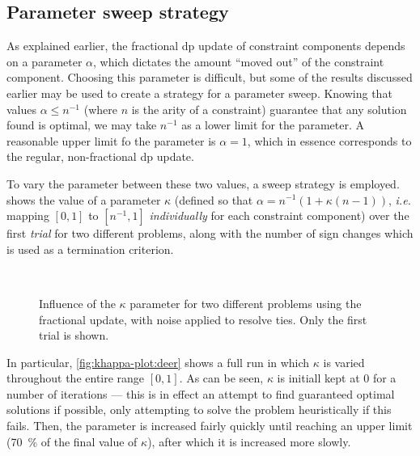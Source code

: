 \subsection{Parameter sweep strategy}
As explained earlier, the fractional \gls{dp} update of constraint components depends on a parameter \(\alpha\), which dictates the amount \enquote{moved out} of the constraint component.
Choosing this parameter is difficult, but some of the results discussed earlier may be used to create a strategy for a parameter sweep.
Knowing that values \(\alpha\leq n^{-1}\) (where \(n\) is the arity of a constraint) guarantee that any solution found is optimal, we may take \(n^{-1}\) as a lower limit for the parameter.
A reasonable upper limit fo the parameter is \(\alpha=1\), which in essence corresponds to the regular, non-fractional \gls{dp} update.

To vary the parameter between these two values, a sweep strategy is employed.
 shows the value of a parameter \(\kappa\) (defined so that \(\alpha = n^{-1}\left(1 + \kappa(n - 1)\right)\), \emph{i.e.} mapping \(\left[0,1\right]\) to \(\left[n^{-1},1\right]\) \emph{individually} for each constraint component) over the first \emph{trial} for two different problems, along with the number of sign changes which is used as a termination criterion.

\begin{figure}[p]
	\centering
	\\
	\caption{Influence of the \(\kappa\) parameter for two different problems using the fractional update, with noise applied to resolve ties. Only the first trial is shown.}
	\label{fig:khappa-plot}
\end{figure}

In particular, \cref{fig:khappa-plot:deer} shows a full run in which \(\kappa\) is varied throughout the entire range \([0,1]\).
As can be seen, \(\kappa\) is initiall kept at 0 for a number of iterations --- this is in effect an attempt to find guaranteed optimal solutions if possible, only attempting to solve the problem heuristically if this fails.
Then, the parameter is increased fairly quickly until reaching an upper limit (\SI{70}{\percent} of the final value of \(\kappa\)), after which it is increased more slowly.

